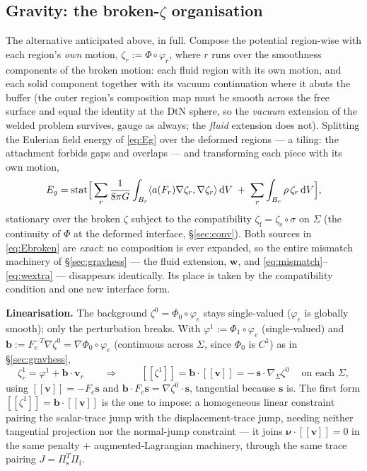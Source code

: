 \documentclass[11pt]{article}
\newcommand{\bnu}{\bm{\nu}}
\newcommand{\bs}{\mathbf{s}}
\newcommand{\bv}{\mathbf{v}}
\newcommand{\bw}{\mathbf{w}}
\newcommand{\jump}[1]{[\![#1]\!]}
\newcommand{\dV}{\,\mathrm{d}V}
\begin{document}
\subsection{\texorpdfstring{Gravity: the broken-$\zeta$ organisation}{Gravity: the broken-zeta organisation}}
\label{sec:brokenzeta}

The alternative anticipated above, in full. Compose the potential
region-wise with each region's \emph{own} motion, $\zeta_r :=
\Phi\circ\varphi_r$, where $r$ runs over the smoothness components of
the broken motion: each fluid region with its own motion, and each
solid component together with its vacuum continuation where it abuts
the buffer (the outer region's composition map must be smooth across
the free surface and equal the identity at the DtN sphere, so the
\emph{vacuum} extension of the welded problem survives, gauge as
always; the \emph{fluid} extension does not). Splitting the Eulerian
field energy of \eqref{eq:Eg} over the deformed regions --- a tiling:
the attachment forbids gaps and overlaps --- and transforming each
piece with its own motion,
\begin{equation}
  E_g = \operatorname{stat}
  \Bigl[\, \sum_r \frac{1}{8\pi G}\int_{B_r}
  \langle a(F_r)\nabla\zeta_r, \nabla\zeta_r\rangle \dV
  \;+\; \sum_r \int_{B_r}\rho\,\zeta_r \dV \Bigr],
  \label{eq:Ebroken}
\end{equation}
stationary over the broken $\zeta$ subject to the compatibility
$\zeta_{\mathrm{f}} = \zeta_{\mathrm{s}}\circ\sigma$ on $\Sigma$ (the
continuity of $\Phi$ at the deformed interface, \S\ref{sec:conv}).
Both sources in \eqref{eq:Ebroken} are \emph{exact}: no composition
is ever expanded, so the entire mismatch machinery of
\S\ref{sec:gravhess} --- the fluid extension, $\bw$, and
\eqref{eq:mismatch}--\eqref{eq:wextra} --- disappears identically.
Its place is taken by the compatibility condition and one new
interface form.

\textbf{Linearisation.} The background $\zeta^0 = \Phi_0\circ\varphi_e$
stays single-valued ($\varphi_e$ is globally smooth); only the
perturbation breaks. With $\varphi^1 := \Phi_1\circ\varphi_e$
(single-valued) and $\mathbf{b} := F_e^{-T}\nabla\zeta^0 =
\nabla\Phi_0\circ\varphi_e$ (continuous across $\Sigma$, since
$\Phi_0$ is $C^1$) as in \S\ref{sec:gravhess},
\begin{equation}
  \zeta_r^1 = \varphi^1 + \mathbf{b}\cdot\bv_r
  \qquad\Longrightarrow\qquad
  \boxed{\ \jump{\zeta^1} = \mathbf{b}\cdot\jump{\bv}
        = -\,\bs\cdot\nabla_\Sigma\zeta^0 \ }
  \quad\text{on each } \Sigma,
  \label{eq:zjump}
\end{equation}
using $\jump{\bv} = -F_e\bs$ and $\mathbf{b}\cdot F_e\bs =
\nabla\zeta^0\cdot\bs$, tangential because $\bs$ is. The first form
$\jump{\zeta^1} = \mathbf{b}\cdot\jump{\bv}$ is the one to impose: a
homogeneous linear constraint pairing the scalar-trace jump with the
displacement-trace jump, needing neither tangential projection nor
the normal-jump constraint --- it joins $\bnu\cdot\jump{\bv} = 0$ in
the same penalty + augmented-Lagrangian machinery, through the same
trace pairing $J = \Pi_{\mathrm{s}}^T\Pi_{\mathrm{f}}$.
\end{document}

